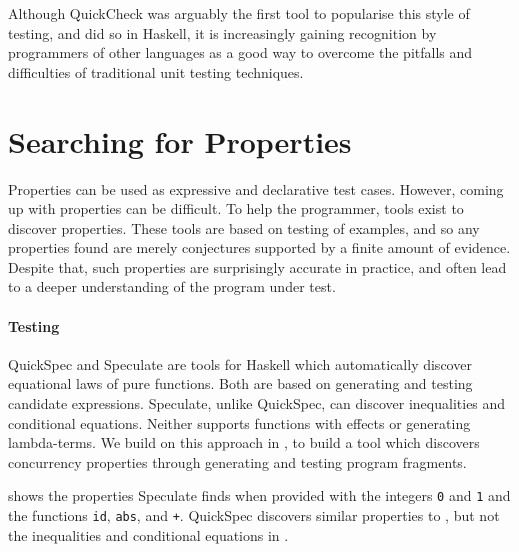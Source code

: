 Although QuickCheck was arguably the first tool to popularise this style of
testing, and did so in Haskell, it is increasingly gaining recognition by
programmers of other languages as a good way to overcome the pitfalls and
difficulties of traditional unit testing techniques.

\section{Searching for Properties}
\label{sec:property_testing-gen}

Properties can be used as expressive and declarative test cases.
However, coming up with properties can be difficult.  To help the
programmer, tools exist to discover properties.  These tools are based
on testing of examples, and so any properties found are merely
conjectures supported by a finite amount of evidence.  Despite that,
such properties are surprisingly accurate in practice, and often lead
to a deeper understanding of the program under test.

\paragraph{Testing}
QuickSpec \parencite{claessen2010,smallbone2017} and Speculate
\parencite{braquehais2017} are tools for Haskell which automatically
discover equational laws of pure functions.  Both are based on
generating and testing candidate expressions.  Speculate, unlike
QuickSpec, can discover inequalities and conditional equations.
Neither supports functions with effects or generating lambda-terms.
We build on this approach in , to build a tool which
discovers concurrency properties through generating and testing
program fragments.

 shows the properties Speculate finds when
provided with the integers \verb|0| and \verb|1| and the functions
\verb|id|, \verb|abs|, and \verb|+|.  QuickSpec discovers similar
properties to , but not the inequalities and
conditional equations in .


